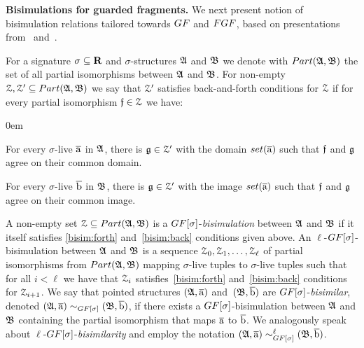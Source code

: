 \noindent \textbf{Bisimulations for guarded fragments.}
%
We next present notion of bisimulation relations tailored towards $\GF$ and $\FGF$, based on presentations from~\cite[Sec. 2.2.3]{Otto04} and~\cite[Sec. 2]{BednarczykJ22}.

For a signature $\sigma \subseteq \mathbf{R}$ and $\sigma$-structures ${\mathfrak{A}}$ and ${\mathfrak{B}}$ we denote with $\PartIso{\str{A}}{\str{B}}$ the set of all partial isomorphisms between ${\mathfrak{A}}$ and ${\mathfrak{B}}$. 
For non-empty $\bisimZ, \bisimZ' \subseteq \PartIso{\str{A}}{\str{B}}$ we say that $\mathcal{Z}'$ satisfies back-and-forth conditions for $\mathcal{Z}$ if for every partial isomorphism $\mathfrak{f} \in \mathcal{Z}$ we have:
%
\begin{description}\itemsep0em
  \item[\desclabel{(Forth)}{bisim:forth}] For every $\sigma$-live $\overline{\mathrm{a}}$ in ${\mathfrak{A}}$, there is $\mathfrak{g} \in \mathcal{Z}'$ with the domain $\set(\elemtuplea)$ such that $\mathfrak{f}$ and $\mathfrak{g}$ agree on their common domain. 
  \item[\desclabel{(Back)}{bisim:back}] For every $\sigma$-live $\overline{\mathrm{b}}$ in ${\mathfrak{B}}$, there is $\mathfrak{g} \in \mathcal{Z}'$ with the image $\set(\elemtuplea)$ such that $\mathfrak{f}$ and $\mathfrak{g}$ agree on their common image.
\end{description}
A non-empty set $\bisimZ \subseteq \PartIso{\str{A}}{\str{B}}$ is a $\GF[\sigma]$-\emph{bisimulation} between ${\mathfrak{A}}$ and ${\mathfrak{B}}$ if it itself satisfies \ref{bisim:forth} and~\ref{bisim:back} conditions given above. 
An $\ell$-$\GF[\sigma]$-bisimulation between ${\mathfrak{A}}$ and ${\mathfrak{B}}$ is a sequence $\mathcal{Z}_0, \mathcal{Z}_1, \ldots, \mathcal{Z}_\ell$ of partial isomorphisms from $\PartIso{\str{A}}{\str{B}}$ mapping $\sigma$-live tuples to $\sigma$-live tuples  such that for all $i < \ell$ we have that $\mathcal{Z}_i$ satisfies~\ref{bisim:forth} and~\ref{bisim:back} conditions for $\mathcal{Z}_{i{+}1}$.
We say that pointed structures $({\mathfrak{A}}, \overline{\mathrm{a}})$ and~$({\mathfrak{B}}, \overline{\mathrm{b}})$ are $\GF[\sigma]$-\emph{bisimilar}, denoted $(\str{A}, \elemtuplea) \bisimto_{\GF[\sigma]} (\str{B}, \elemtupleb)$, if there exists a $\GF[\sigma]$-bisimulation  between ${\mathfrak{A}}$ and ${\mathfrak{B}}$ containing the partial isomorphism that maps $\overline{\mathrm{a}}$ to $\overline{\mathrm{b}}$.
We analogously speak about $\ell$-$\GF[\sigma]$-\emph{bisimilarity} and employ the notation $(\str{A}, \elemtuplea) \bisimto_{\GF[\sigma]}^{\ell} (\str{B}, \elemtupleb)$.

